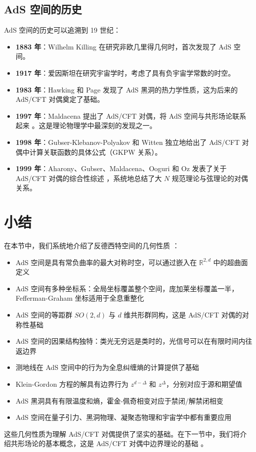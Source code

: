 \subsection{AdS 空间的历史}

AdS 空间的历史可以追溯到 19 世纪：
\begin{itemize}
    \item \textbf{1883 年}：Wilhelm Killing 在研究非欧几里得几何时，首次发现了 AdS 空间。
    \item \textbf{1917 年}：爱因斯坦在研究宇宙学时，考虑了具有负宇宙学常数的时空。
    \item \textbf{1983 年}：Hawking 和 Page 发现了 AdS 黑洞的热力学性质，这为后来的 AdS/CFT 对偶奠定了基础。
    \item \textbf{1997 年}：Maldacena 提出了 AdS/CFT 对偶，将 AdS 空间与共形场论联系起来 \cite{Maldacena1997}。这是理论物理学中最深刻的发现之一。
    \item \textbf{1998 年}：Gubser-Klebanov-Polyakov \cite{Gubser1998} 和 Witten \cite{Witten1998} 独立地给出了 AdS/CFT 对偶中计算关联函数的具体公式（GKPW 关系）。
    \item \textbf{1999 年}：Aharony、Gubser、Maldacena、Ooguri 和 Oz 发表了关于 AdS/CFT 对偶的综合性综述 \cite{Aharony1999}，系统地总结了大 $N$ 规范理论与弦理论的对偶关系。
\end{itemize}

\section{小结}

在本节中，我们系统地介绍了反德西特空间的几何性质 \cite{Aharony1999}：
\begin{itemize}
    \item AdS 空间是具有常负曲率的最大对称时空，可以通过嵌入在 $\mathbb{R}^{2,d}$ 中的超曲面定义
    \item AdS 空间有多种坐标系：全局坐标覆盖整个空间，庞加莱坐标覆盖一半，Fefferman-Graham 坐标适用于全息重整化 \cite{Witten1998}
    \item AdS 空间的等距群 $SO(2,d)$ 与 $d$ 维共形群同构，这是 AdS/CFT 对偶的对称性基础 \cite{Maldacena1997}
    \item AdS 空间的因果结构独特：类光无穷远是类时的，光信号可以在有限时间内往返边界 \cite{Witten1998}
    \item 测地线在 AdS 空间中的行为为全息纠缠熵的计算提供了基础
    \item Klein-Gordon 方程的解具有边界行为 $z^{d-\Delta}$ 和 $z^\Delta$，分别对应于源和期望值 \cite{Witten1998}
    \item AdS 黑洞具有有限温度和熵，霍金-佩奇相变对应于禁闭/解禁闭相变 \cite{Hawking1983, Witten1998b}
    \item AdS 空间在量子引力、黑洞物理、凝聚态物理和宇宙学中都有重要应用
\end{itemize}
这些几何性质为理解 AdS/CFT 对偶提供了坚实的基础。在下一节中，我们将介绍共形场论的基本概念，这是 AdS/CFT 对偶中边界理论的基础 \cite{Maldacena1997}。

